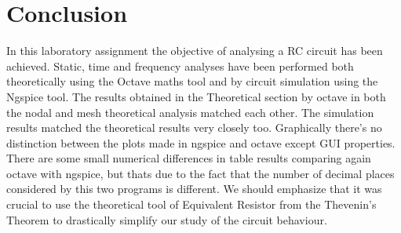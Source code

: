 \newpage

\section{Conclusion}
\label{sec:conclusion}
\vspace{10mm}
In this laboratory assignment the objective of analysing a RC circuit has been achieved. 
Static, time and frequency analyses have been performed both
theoretically using the Octave maths tool and by circuit simulation using the
Ngspice tool.
The results obtained in the Theoretical section by octave in both the nodal and mesh theoretical analysis matched each other. 
The simulation results matched the theoretical results very closely too.
Graphically there's no distinction between the plots made in ngspice and octave except GUI properties.
There are some small numerical differences in table results comparing again octave with ngspice, but thats due to the fact that
the number of decimal places considered by this two programs is different.
We should emphasize that it was crucial to use the theoretical tool of Equivalent Resistor from the Thevenin's Theorem
to drastically simplify our study of the circuit behaviour.

